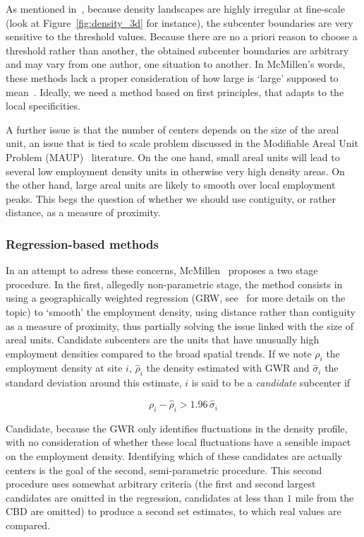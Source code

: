 As mentioned in~\cite{Anas:1998}, because density landscapes are highly
irregular at fine-scale (look at Figure~\ref{fig:density_3d} for instance), the
subcenter boundaries are very sensitive to the threshold values. Because there
are no a priori reason to choose a threshold rather than another, the obtained
subcenter boundaries are arbitrary and may vary from one author, one situation
to another. In McMillen's words, these methods lack a proper consideration of
how large is `large' supposed to mean~\cite{McMillen:2003}. Ideally, we
need a method based on first principles, that adapts to the local specificities.

A further issue is that the number of centers depends on the size of the areal unit, an
issue that is tied to scale problem discussed in the Modifiable Areal Unit
Problem (MAUP)~\cite{Openshaw:1984} literature. On the one hand, small areal units will
lead to several low employment density units in otherwise very high density
areas. On the other hand, large areal units are likely to smooth over local
employment peaks. This begs the question of whether we should use contiguity, or
rather distance, as a measure of proximity.\\


\subsubsection{Regression-based methods}
\label{ssub:regression_based_methods}

In an attempt to adress these concerns, McMillen~\cite{McMillen:2001} proposes a two stage
procedure. In the first, allegedly non-parametric stage, the method consists in using a
geographically weighted regression (GRW, see~\cite{Brunsdon:1998} for more details on
the topic) to `smooth' the employment density, using distance rather
than contiguity as a measure of proximity, thus partially solving the issue
linked with the size of areal units. 
Candidate subcenters are the units that have unusually high employment densities
compared to the broad spatial trends.  If we note $\rho_i$ the employment
density at site $i$, $\hat{\rho}_i$ the density estimated with GWR and
$\hat{\sigma}_i$ the standard deviation around this estimate, $i$ is said to be
a \emph{candidate} subcenter if 

\begin{equation*}
    \rho_i - \hat{\rho}_i > 1.96\,\hat{\sigma}_i
\end{equation*}

Candidate, because the GWR only identifies fluctuations in the density profile,
with no consideration of whether these local fluctuations have a sensible impact
on the employment density.  Identifying which of these candidates are actually
centers is the goal of the second, semi-parametric procedure. This second
procedure uses somewhat arbitrary criteria (the first and second largest
candidates are omitted in the regression, candidates at less than $1$ mile from
the CBD are omitted) to produce a second set estimates, to which real values are
compared.\\

